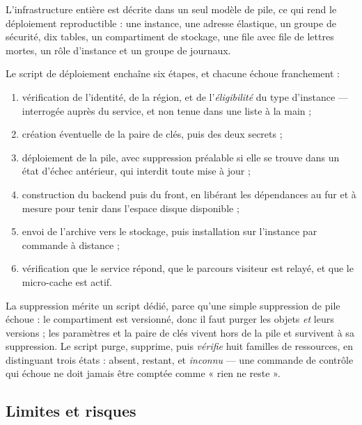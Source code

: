 L'infrastructure entière est décrite dans un seul modèle de pile, ce qui rend le
déploiement reproductible : une instance, une adresse élastique, un groupe de
sécurité, dix tables, un compartiment de stockage, une file avec file de
lettres mortes, un rôle d'instance et un groupe de journaux.

Le script de déploiement enchaîne six étapes, et chacune échoue franchement :

\begin{enumerate}[leftmargin=1.4em,itemsep=2pt]
  \item vérification de l'identité, de la région, et de l'\emph{éligibilité} du
        type d'instance — interrogée auprès du service, et non tenue dans une
        liste à la main ;
  \item création éventuelle de la paire de clés, puis des deux secrets ;
  \item déploiement de la pile, avec suppression préalable si elle se trouve
        dans un état d'échec antérieur, qui interdit toute mise à jour ;
  \item construction du backend puis du front, en libérant les dépendances au
        fur et à mesure pour tenir dans l'espace disque disponible ;
  \item envoi de l'archive vers le stockage, puis installation sur l'instance
        par commande à distance ;
  \item vérification que le service répond, que le parcours visiteur est
        relayé, et que le micro-cache est actif.
\end{enumerate}

La suppression mérite un script dédié, parce qu'une simple suppression de pile
échoue : le compartiment est versionné, donc il faut purger les objets
\emph{et} leurs versions ; les paramètres et la paire de clés vivent hors de la
pile et survivent à sa suppression. Le script purge, supprime, puis \emph{vérifie}
huit familles de ressources, en distinguant trois états : absent, restant, et
\emph{inconnu} — une commande de contrôle qui échoue ne doit jamais être comptée
comme « rien ne reste ».

\subsection{Limites et risques}

